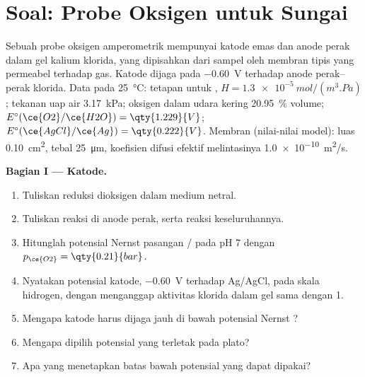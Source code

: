 \section{Soal: Probe Oksigen untuk Sungai}

\begin{problem}
\label{pb:b2:current-potential-curves:1}
Sebuah probe oksigen amperometrik mempunyai katode emas dan anode perak
dalam gel kalium klorida, yang dipisahkan dari sampel oleh membran tipis
yang permeabel terhadap gas. Katode dijaga pada \qty{-0.60}{V} terhadap
anode perak--perak klorida. Data pada \qty{25}{\degreeCelsius}: tetapan
 untuk , $H = \qty{1.3e-5}{mol/(m^3.Pa)}$; tekanan uap
air \qty{3.17}{kPa}; oksigen dalam udara kering 20.95~\% volume;
$E^\circ(\ce{O2}/\ce{H2O}) =
\qty{1.229}{V}$;
$E^\circ(\ce{AgCl}/\ce{Ag}) = \qty{0.222}{V}$. Membran (nilai-nilai model):
luas \qty{0.10}{cm^2}, tebal \qty{25}{\micro m}, koefisien difusi efektif
 melintasinya \qty{1.0e-10}{m^2/s}.

\medskip
\noindent\textbf{Bagian I --- Katode.}
\begin{enumerate}
  \item Tuliskan reduksi dioksigen dalam medium netral.
  \item Tuliskan reaksi di anode perak, serta reaksi keseluruhannya.
  \item Hitunglah potensial Nernst pasangan / pada pH 7 dengan
        $p_{\ce{O2}} = \qty{0.21}{bar}$.
  \item Nyatakan potensial katode, \qty{-0.60}{V} terhadap Ag/AgCl, pada
        skala hidrogen, dengan menganggap aktivitas klorida dalam gel sama
        dengan 1.
  \item Mengapa katode harus dijaga jauh di bawah potensial Nernst ?
  \item Mengapa dipilih potensial yang terletak pada plato?
  \item Apa yang menetapkan batas bawah potensial yang dapat dipakai?
\end{enumerate}


\end{problem}
